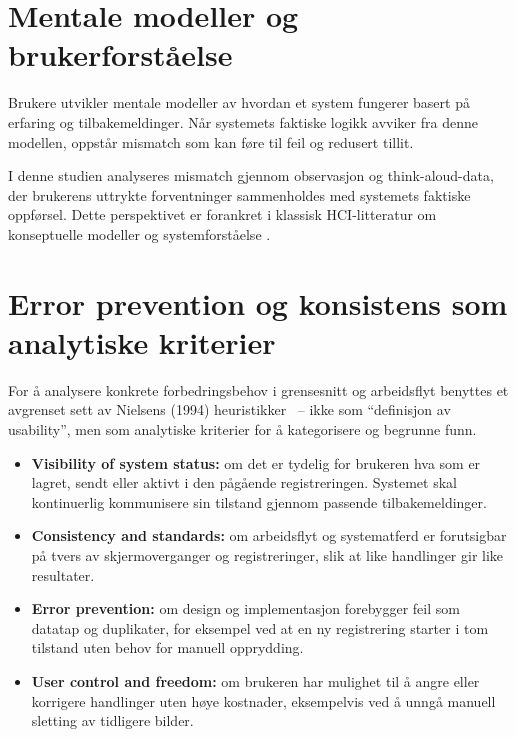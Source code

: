 \section{Mentale modeller og brukerforståelse}

Brukere utvikler mentale modeller av hvordan et system fungerer basert på erfaring og tilbakemeldinger. Når systemets faktiske logikk avviker fra denne modellen, oppstår mismatch som kan føre til feil og redusert tillit.

I denne studien analyseres mismatch gjennom observasjon og think-aloud-data, der brukerens uttrykte forventninger sammenholdes med systemets faktiske oppførsel. Dette perspektivet er forankret i klassisk HCI-litteratur om konseptuelle modeller og systemforståelse \cite{norman2013}.

\section{Error prevention og konsistens som analytiske kriterier}

For å analysere konkrete forbedringsbehov i grensesnitt og arbeidsflyt benyttes et avgrenset sett av Nielsens (1994) heuristikker~\cite{nielsen1994} – ikke som “definisjon av usability”, men som analytiske kriterier for å kategorisere og begrunne funn.

\begin{itemize}
\item \textbf{Visibility of system status:} om det er tydelig for brukeren hva som er lagret, sendt eller aktivt i den pågående registreringen. Systemet skal kontinuerlig kommunisere sin tilstand gjennom passende tilbakemeldinger.

\item \textbf{Consistency and standards:} om arbeidsflyt og systematferd er forutsigbar på tvers av skjermoverganger og registreringer, slik at like handlinger gir like resultater.

\item \textbf{Error prevention:} om design og implementasjon forebygger feil som datatap og duplikater, for eksempel ved at en ny registrering starter i tom tilstand uten behov for manuell opprydding.

\item \textbf{User control and freedom:} om brukeren har mulighet til å angre eller korrigere handlinger uten høye kostnader, eksempelvis ved å unngå manuell sletting av tidligere bilder.
\end{itemize}

